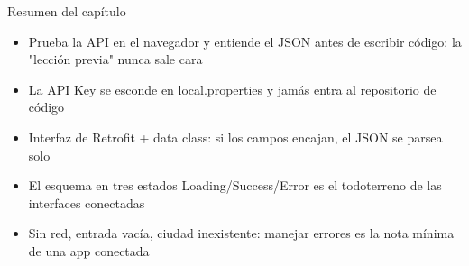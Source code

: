 \begin{tcbsummary}{Resumen del capítulo}
\begin{itemize}
  \item Prueba la API en el navegador y entiende el JSON antes de escribir código: la "lección previa" nunca sale cara
  \item La API Key se esconde en local.properties y jamás entra al repositorio de código
  \item Interfaz de Retrofit + data class: si los campos encajan, el JSON se parsea solo
  \item El esquema en tres estados Loading/Success/Error es el todoterreno de las interfaces conectadas
  \item Sin red, entrada vacía, ciudad inexistente: manejar errores es la nota mínima de una app conectada
\end{itemize}

\end{tcbsummary}
